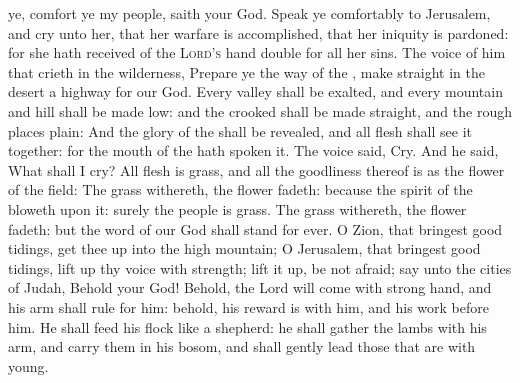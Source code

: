 ye, comfort ye my people, saith your God. Speak ye comfortably to Jerusalem, and cry unto her, that her warfare is accomplished, that her iniquity is pardoned: for she hath received of the {\textsc{Lord's}} hand double for all her sins. The voice of him that crieth in the wilderness, Prepare ye the way of the , make straight in the desert a highway for our God. Every valley shall be exalted, and every mountain and hill shall be made low: and the crooked shall be made straight, and the rough places plain: And the glory of the  shall be revealed, and all flesh shall see it together: for the mouth of the  hath spoken it. The voice said, Cry. And he said, What shall I cry? All flesh is grass, and all the goodliness thereof is as the flower of the field: The grass withereth, the flower fadeth: because the spirit of the  bloweth upon it: surely the people is grass. The grass withereth, the flower fadeth: but the word of our God shall stand for ever. O Zion, that bringest good tidings, get thee up into the high mountain; O Jerusalem, that bringest good tidings, lift up thy voice with strength; lift it up, be not afraid; say unto the cities of Judah, Behold your God! Behold, the Lord  will come with strong hand, and his arm shall rule for him: behold, his reward is with him, and his work before him. He shall feed his flock like a shepherd: he shall gather the lambs with his arm, and carry them in his bosom, and shall gently lead those that are with young.


